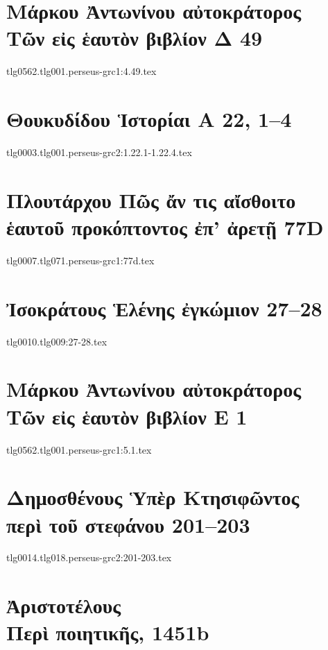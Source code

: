 \documentclass[a4paper,12pt,twoside]{report}
\begin{document}
\chapter[Μάρκου Ἀντωνίνου Τῶν εἰς ἑαυτὸν Δ 49]{\textgreek[variant=ancient]{Μάρκου Ἀντωνίνου αὐτοκράτορος \\Τῶν εἰς ἑαυτὸν βιβλίον Δ} 49}
{tlg0562.tlg001.perseus-grc1:4.49.tex}

\chapter[Θουκυδίδου Ἱστορίαι Α]{\textgreek[variant=ancient]{Θουκυδίδου Ἱστορίαι Α} 22, 1–4}
{tlg0003.tlg001.perseus-grc2:1.22.1-1.22.4.tex}

\chapter[Πλουτάρχου Πῶς ἄν τις αἴσθοιτο ἑαυτοῦ\dots]{\textgreek[variant=ancient]{Πλουτάρχου Πῶς ἄν τις αἴσθοιτο ἑαυτοῦ προκόπτοντος ἐπ' ἀρετῇ} 77D}
{tlg0007.tlg071.perseus-grc1:77d.tex}

\chapter[Ἰσοκράτους Ἑλένης ἐγκώμιον 27]{\textgreek[variant=ancient]{Ἰσοκράτους Ἑλένης ἐγκώμιον} 27–28}
{tlg0010.tlg009:27-28.tex}

\chapter[Μάρκου Ἀντωνίνου Τῶν εἰς ἑαυτόν Ε 1]{\textgreek[variant=ancient]{Μάρκου Ἀντωνίνου αὐτοκράτορος \\Τῶν εἰς ἑαυτὸν βιβλίον Ε} 1}
{tlg0562.tlg001.perseus-grc1:5.1.tex}

\chapter[Δημοσθένους Περὶ τοῦ στεφάνου]{\textgreek[variant=ancient]{Δημοσθένους Ὑπὲρ Κτησιφῶντος \\περὶ τοῦ στεφάνου} 201–203}
{tlg0014.tlg018.perseus-grc2:201-203.tex}

\chapter[Ἀριστοτέλους Περὶ ποιητικῆς]{\textgreek[variant=ancient]{Ἀριστοτέλους \\Περὶ ποιητικῆς,} 1451b}
\end{document}
